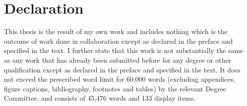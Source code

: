\chapter{Declaration}
This thesis is the result of my own work and includes nothing which is the outcome of work done in collaboration except as declared in the preface and specified in the text. I further state that this work is not substantially the same as any work that has already been submitted before for any degree or other qualification except as declared in the preface and specified in the text. It does not exceed the prescribed word limit for 60,000 words (excluding appendices, figure captions, bibliography, footnotes and tables) by the relevant Degree Committee, and consists of 45,476 words and 133 display items.


